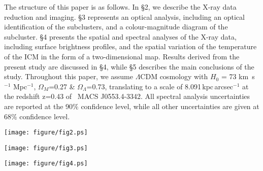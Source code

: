 \documentclass[useASM,usenatbib]{mn2e}
\newcommand{\mac}{\rm~MACS J0553.4-3342}
\begin{document}
The structure of this paper is as follows. In \S2, we describe the
X-ray data reduction and imaging. \S3 represents an optical analysis, including an optical identification of the subclusters, and a colour-magnitude diagram of the subcluster. \S4 presents the
spatial and spectral analyses of the X-ray data, including surface
brightness profiles, and the spatial variation of the temperature of
the ICM in the form of a two-dimensional map. Results derived from the
present study are discussed in \S4, while \S5 describes the main
conclusions of the study. Throughout this paper, we assume
$\Lambda$CDM cosmology with $H_0$ = 73 km\, s$^{-1}$ Mpc$^{-1}$,
$\Omega_M$=0.27 \& $\Omega_{\Lambda}$=0.73, translating to a scale of
8.091\,kpc\,arcsec$^{-1}$ at the redshift z=0.43 of \mac. All spectral
analysis uncertainties are reported at the 90$\%$ confidence level,
while all other uncertainties are given at 68$\%$ confidence level.

\begin{figure*}
\center
\texttt{[image: figure/fig2.ps]}
\caption{Tri-colour image of \mac\ obtained using 0.7$-$4.0\,keV \textit{Chandra} X-ray data (shown in blue colour),  HST optical $I$ band (F814W)  data (red colour) and the GMRT 323 MHz data (green colour). This figure reveals the optical counterparts of the two subclusters (SC1 and SC2).}
\label{fig9}
\end{figure*}
\begin{figure*}
\texttt{[image: figure/fig3.ps]}
\caption{
  HST 
  $I$-band (F814W) images of three regions of the \mac\ system,
  centred on SC0, SC1 and SC2 respectively, each 30$\arcsec \times 30\arcsec$ in size. A disk galaxy with a prominent dust lane dominates SC0.
 }
\label{optstamp}
\end{figure*}

\begin{figure*}
\center
\texttt{[image: figure/fig4.ps]}
\caption{
  An HST image of  (F814W) the central
   $\sim$ 3.3$\arcmin \times 3.3\arcmin$ region of \mac.
The subclusters SC1 and SC2 are indicated,
  and their BCGs and neighbouring members from the inner
  30$\arcsec$ are shown by black dotted circles. The red circles indicate
  the galaxies with $I$-band magnitude in the range of 18.5$-$27,
  while the blue circles mark the galaxies with $V-I$ colours in the
  range  $V-I=1.0-1.25$. The point ``x" indicates the position of
  the X-ray peak associated with the subcluster SC1.}
\label{Fig5_1}
\end{figure*}
\end{document}

